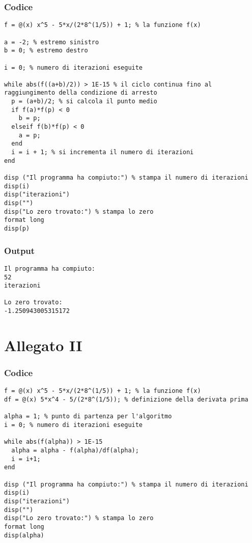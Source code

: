 \subsection*{Codice}
\begin{lstlisting}
f = @(x) x^5 - 5*x/(2*8^(1/5)) + 1; % la funzione f(x)

a = -2; % estremo sinistro
b = 0; % estremo destro 

i = 0; % numero di iterazioni eseguite

while abs(f((a+b)/2)) > 1E-15 % il ciclo continua fino al raggiungimento della condizione di arresto 
  p = (a+b)/2; % si calcola il punto medio
  if f(a)*f(p) < 0
    b = p;
  elseif f(b)*f(p) < 0
    a = p;
  end
  i = i + 1; % si incrementa il numero di iterazioni
end

disp ("Il programma ha compiuto:") % stampa il numero di iterazioni
disp(i)
disp("iterazioni")
disp("")
disp("Lo zero trovato:") % stampa lo zero
format long
disp(p)
\end{lstlisting}

\subsection*{Output}
\begin{lstlisting}
Il programma ha compiuto:
52
iterazioni

Lo zero trovato:
-1.250943005315172
\end{lstlisting}
\vfill

\chapter{Allegato II}\label{all:2}

\subsection*{Codice}
\begin{lstlisting}
f = @(x) x^5 - 5*x/(2*8^(1/5)) + 1; % la funzione f(x)
df = @(x) 5*x^4 - 5/(2*8^(1/5)); % definizione della derivata prima

alpha = 1; % punto di partenza per l'algoritmo
i = 0; % numero di iterazioni eseguite

while abs(f(alpha)) > 1E-15
  alpha = alpha - f(alpha)/df(alpha);
  i = i+1;
end

disp ("Il programma ha compiuto:") % stampa il numero di iterazioni
disp(i)
disp("iterazioni")
disp("")
disp("Lo zero trovato:") % stampa lo zero
format long
disp(alpha)
\end{lstlisting}

